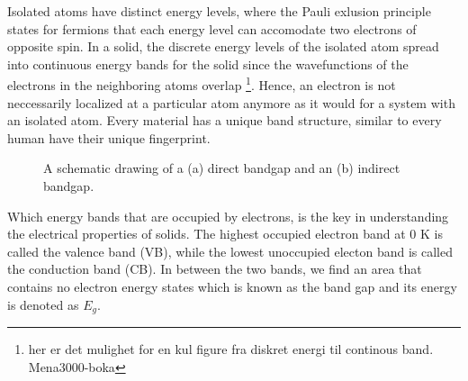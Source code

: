Isolated atoms have distinct energy levels, where the Pauli exlusion principle \cite{Pauli1925} states for fermions that each energy level can accomodate two electrons of opposite spin. In a solid, the discrete energy levels of the isolated atom spread into continuous energy bands for the solid since the wavefunctions of the electrons in the neighboring atoms overlap \footnote{her er det mulighet for en kul figure fra diskret energi til continous band. Mena3000-boka}. Hence, an electron is not neccessarily localized at a particular atom anymore as it would for a system with an isolated atom. Every material has a unique band structure, similar to every human have their unique fingerprint.

\begin{figure}
  \begin{minipage}{\linewidth}
    \centering\captionsetup[subfigure]{justification=centering}
  \subcaption{}
  \label{fig:directbandgap}
  \label{fig:indirectbandgap}
  \subcaption{}
  \end{minipage}
  \caption{A schematic drawing of a (a) direct bandgap and an (b) indirect bandgap.}
\end{figure}

Which energy bands that are occupied by electrons, is the key in understanding the electrical properties of solids. The highest occupied electron band at $0$ K is called the valence band (VB), while the lowest unoccupied electon band is called the conduction band (CB). In between the two bands, we find an area that contains no electron energy states which is known as the band gap and its energy is denoted as $E_g$.

